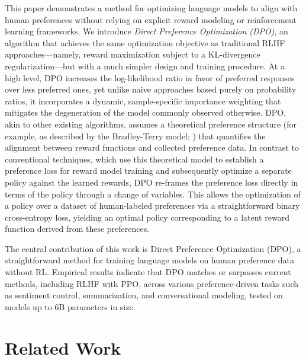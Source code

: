 This paper demonstrates a method for optimizing language models to align with human preferences without relying on explicit reward modeling or reinforcement learning frameworks. We introduce \textit{Direct Preference Optimization (DPO)}, an algorithm that achieves the same optimization objective as traditional RLHF approaches—namely, reward maximization subject to a KL-divergence regularization—but with a much simpler design and training procedure. At a high level, DPO increases the log-likelihood ratio in favor of preferred responses over less preferred ones, yet unlike naive approaches based purely on probability ratios, it incorporates a dynamic, sample-specific importance weighting that mitigates the degeneration of the model commonly observed otherwise. DPO, akin to other existing algorithms, assumes a theoretical preference structure (for example, as described by the Bradley-Terry model; \cite{bradley1952rankanalysis}) that quantifies the alignment between reward functions and collected preference data. In contrast to conventional techniques, which use this theoretical model to establish a preference loss for reward model training and subsequently optimize a separate policy against the learned rewards, DPO re-frames the preference loss directly in terms of the policy through a change of variables. This allows the optimization of a policy over a dataset of human-labeled preferences via a straightforward binary cross-entropy loss, yielding an optimal policy corresponding to a latent reward function derived from these preferences.

The central contribution of this work is Direct Preference Optimization (DPO), a straightforward method for training language models on human preference data without RL. Empirical results indicate that DPO matches or surpasses current methods, including RLHF with PPO, across various preference-driven tasks such as sentiment control, summarization, and conversational modeling, tested on models up to 6B parameters in size.

\section{Related Work}


